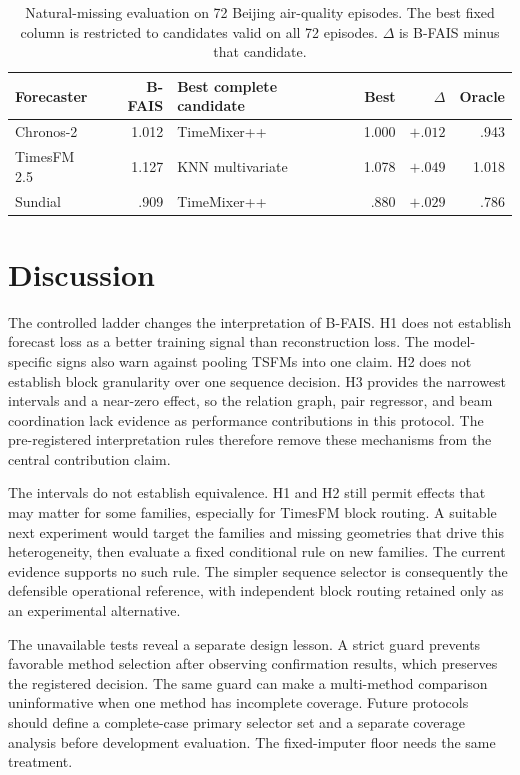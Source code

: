 \documentclass{article}
\newcommand{\bfais}{\textsc{B-FAIS}\xspace}
\begin{document}
\begin{table}[t]
\caption{Natural-missing evaluation on 72 Beijing air-quality episodes. The best fixed column is restricted to candidates valid on all 72 episodes. $\Delta$ is \bfais minus that candidate.}
\label{tab:native}
\centering
\small
\setlength{\tabcolsep}{3.8pt}
\begin{tabular}{lrlrrr}
\toprule
Forecaster & \bfais & Best complete candidate & Best & $\Delta$ & Oracle \\
\midrule
Chronos-2 & 1.012 & TimeMixer++ & 1.000 & $+.012$ & .943 \\
TimesFM 2.5 & 1.127 & KNN multivariate & 1.078 & $+.049$ & 1.018 \\
Sundial & .909 & TimeMixer++ & .880 & $+.029$ & .786 \\
\bottomrule
\end{tabular}
\end{table}

\section{Discussion}
\label{sec:discussion}

The controlled ladder changes the interpretation of \bfais. H1 does not establish forecast loss as a better training signal than reconstruction loss. The model-specific signs also warn against pooling TSFMs into one claim. H2 does not establish block granularity over one sequence decision. H3 provides the narrowest intervals and a near-zero effect, so the relation graph, pair regressor, and beam coordination lack evidence as performance contributions in this protocol. The pre-registered interpretation rules therefore remove these mechanisms from the central contribution claim.

The intervals do not establish equivalence. H1 and H2 still permit effects that may matter for some families, especially for TimesFM block routing. A suitable next experiment would target the families and missing geometries that drive this heterogeneity, then evaluate a fixed conditional rule on new families. The current evidence supports no such rule. The simpler sequence selector is consequently the defensible operational reference, with independent block routing retained only as an experimental alternative.

The unavailable tests reveal a separate design lesson. A strict guard prevents favorable method selection after observing confirmation results, which preserves the registered decision. The same guard can make a multi-method comparison uninformative when one method has incomplete coverage. Future protocols should define a complete-case primary selector set and a separate coverage analysis before development evaluation. The fixed-imputer floor needs the same treatment.
\end{document}
